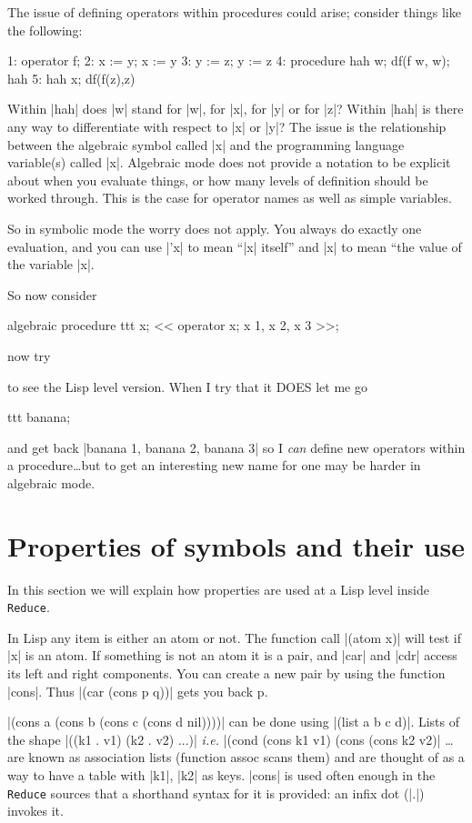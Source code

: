 \documentclass[12pt,twoside,openright]{memoir}
\newcommand{\reduce}{\texttt{Reduce}\xspace}
\begin{document}
The issue of defining operators within procedures could arise;
consider things like the following:
\begin{rlispverb}
1: operator f;
2: x := y;
x := y
3: y := z;
y := z
4: procedure hah w; df(f w, w);
hah
5: hah x;
df(f(z),z)
\end{rlispverb}
Within |hah| does |w| stand for |w|, for |x|, for |y| or for |z|? Within |hah|
is there any way to differentiate with respect to |x| or |y|? The issue is the
relationship between the algebraic symbol called |x| and the programming
language variable(s) called |x|.  Algebraic mode does not provide a notation to
be explicit about when you evaluate things, or how many levels of definition
should be worked through. This is the case for operator names as well as simple
variables.

So in symbolic mode the worry does not apply. You always do exactly one
evaluation, and you can use |'x| to mean ``|x| itself'' and |x| to mean ``the
value of the variable |x|.

So now consider
\begin{rlispverb}
  algebraic procedure ttt x;
  <<
    operator x;
    {x 1, x 2, x 3}
  >>;
\end{rlispverb}
now try
to see the Lisp level version.
When I try that it DOES let me go
\begin{rlispverb}
  ttt banana;
\end{rlispverb}
and get back |{banana 1, banana 2, banana 3}|
so I {\em can} define new operators within a procedure\dots but to get
an interesting new name for one may be harder in algebraic mode.

\section{Properties of symbols and their use}

In this section we will explain how properties are used at a Lisp level inside
\reduce.

In Lisp any item is either an atom or not. The function call |(atom x)| will
test if |x| is an atom. If something is not an atom it is a pair, and |car| and
|cdr| access its left and right components. You can create a new pair by using
the function |cons|. Thus |(car (cons p q))| gets you back p.

|(cons a (cons b (cons c (cons d nil))))| can be done using
|(list a b c d)|. Lists of the shape |((k1 . v1) (k2 . v2) ...)| \emph{i.e.}
|(cond (cons k1 v1) (cons (cons k2 v2)|
\dots are known as association lists (function assoc
scans them) and are thought of as a way to have a table with
|k1|, |k2| as keys. |cons| is used often enough in the \reduce sources that
a shorthand syntax for it is provided: an infix dot (|.|) invokes it.
\end{document}
